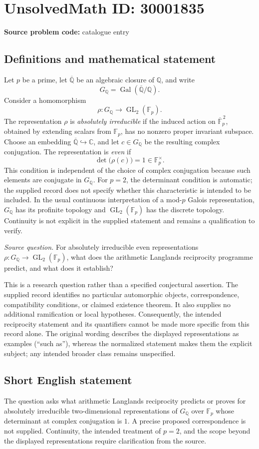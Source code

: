 \documentclass[11pt]{article}
\newcommand{\Q}{\mathbb{Q}}
\newcommand{\C}{\mathbb{C}}
\newcommand{\F}{\mathbb{F}}
\begin{document}
\section*{UnsolvedMath ID: 30001835}
\textbf{Source problem code:} catalogue entry
\subsection{Definitions and mathematical statement}
Let \(p\) be a prime, let \(\overline{\Q}\) be an algebraic closure of \(\Q\), and write
\[
G_{\Q}=\operatorname{Gal}(\overline{\Q}/\Q).
\]
Consider a homomorphism
\[
\rho:G_{\Q}\longrightarrow\operatorname{GL}_2(\F_p).
\]
The representation \(\rho\) is \emph{absolutely irreducible} if the induced action on \(\overline{\F}_p^{\,2}\), obtained by extending scalars from \(\F_p\), has no nonzero proper invariant subspace. Choose an embedding \(\overline{\Q}\hookrightarrow\C\), and let \(c\in G_{\Q}\) be the resulting complex conjugation. The representation is \emph{even} if
\[
\det\bigl(\rho(c)\bigr)=1\in\F_p^{\times}.
\]
This condition is independent of the choice of complex conjugation because such elements are conjugate in \(G_{\Q}\). For \(p=2\), the determinant condition is automatic; the supplied record does not specify whether this characteristic is intended to be included. In the usual continuous interpretation of a mod-\(p\) Galois representation, \(G_{\Q}\) has its profinite topology and \(\operatorname{GL}_2(\F_p)\) has the discrete topology. Continuity is not explicit in the supplied statement and remains a qualification to verify.

\emph{Source question.} For absolutely irreducible even representations \(\rho:G_{\Q}\to\operatorname{GL}_2(\F_p)\), what does the arithmetic Langlands reciprocity programme predict, and what does it establish?

This is a research question rather than a specified conjectural assertion. The supplied record identifies no particular automorphic objects, correspondence, compatibility conditions, or claimed existence theorem. It also supplies no additional ramification or local hypotheses. Consequently, the intended reciprocity statement and its quantifiers cannot be made more specific from this record alone. The original wording describes the displayed representations as examples (``such as''), whereas the normalized statement makes them the explicit subject; any intended broader class remains unspecified.
\subsection{Short English statement}
The question asks what arithmetic Langlands reciprocity predicts or proves for absolutely irreducible two-dimensional representations of \(G_{\Q}\) over \(\F_p\) whose determinant at complex conjugation is \(1\). A precise proposed correspondence is not supplied. Continuity, the intended treatment of \(p=2\), and the scope beyond the displayed representations require clarification from the source.
\end{document}
